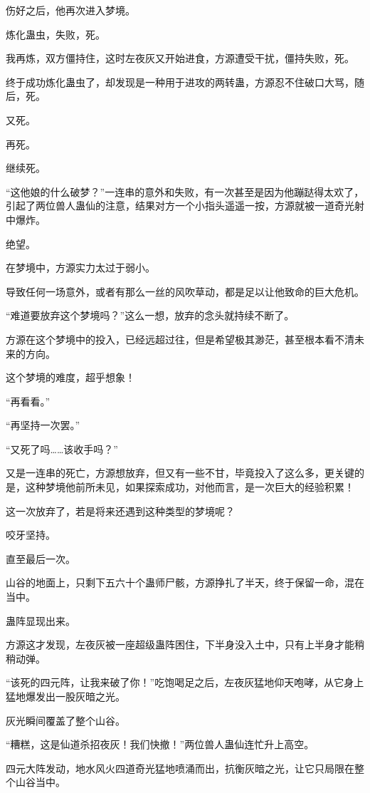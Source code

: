 \begin{this_body}
伤好之后，他再次进入梦境。

炼化蛊虫，失败，死。

我再炼，双方僵持住，这时左夜灰又开始进食，方源遭受干扰，僵持失败，死。

终于成功炼化蛊虫了，却发现是一种用于进攻的两转蛊，方源忍不住破口大骂，随后，死。

又死。

再死。

继续死。

“这他娘的什么破梦？”一连串的意外和失败，有一次甚至是因为他蹦跶得太欢了，引起了两位兽人蛊仙的注意，结果对方一个小指头遥遥一按，方源就被一道奇光射中爆炸。

绝望。

在梦境中，方源实力太过于弱小。

导致任何一场意外，或者有那么一丝的风吹草动，都是足以让他致命的巨大危机。

“难道要放弃这个梦境吗？”这么一想，放弃的念头就持续不断了。

方源在这个梦境中的投入，已经远超过往，但是希望极其渺茫，甚至根本看不清未来的方向。

这个梦境的难度，超乎想象！

“再看看。”

“再坚持一次罢。”

“又死了吗……该收手吗？”

又是一连串的死亡，方源想放弃，但又有一些不甘，毕竟投入了这么多，更关键的是，这种梦境他前所未见，如果探索成功，对他而言，是一次巨大的经验积累！

这一次放弃了，若是将来还遇到这种类型的梦境呢？

咬牙坚持。

直至最后一次。

山谷的地面上，只剩下五六十个蛊师尸骸，方源挣扎了半天，终于保留一命，混在当中。

蛊阵显现出来。

方源这才发现，左夜灰被一座超级蛊阵困住，下半身没入土中，只有上半身才能稍稍动弹。

“该死的四元阵，让我来破了你！”吃饱喝足之后，左夜灰猛地仰天咆哮，从它身上猛地爆发出一股灰暗之光。

灰光瞬间覆盖了整个山谷。

“糟糕，这是仙道杀招夜灰！我们快撤！”两位兽人蛊仙连忙升上高空。

四元大阵发动，地水风火四道奇光猛地喷涌而出，抗衡灰暗之光，让它只局限在整个山谷当中。


\end{this_body}
